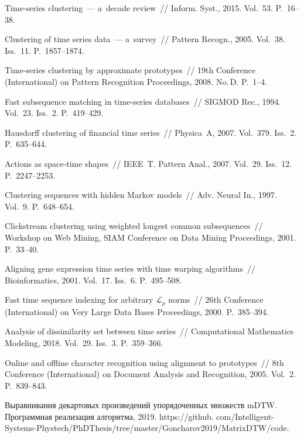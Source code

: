 \begin{multicols}{2}
{{\begin{thebibliography}{99}
Time-series clustering~--- a~decade review~// Inform. Syst., 
2015. Vol.~53. P.~16--38.

 Clustering of time series data~--- a~survey~// 
Pattern Recogn., 2005. Vol.~38. Iss.~11. P.~1857--1874.



Time-series clustering by approximate prototypes~// 
19th  Conference (International) on Pattern Recognition Proceedings, 2008. No.\,D. 
P.~1--4.

Fast subsequence matching in time-series databases~// \mbox{SIGMOD} Rec., 1994. 
Vol.~23. Iss.~2. P.~419--429.

 Hausdorff clustering of financial time series~// 
Physica~A, 2007. Vol.~379. Iss.~2. P.~635--644.

Actions as space-time shapes~// IEEE~T. Pattern Anal., 
2007. Vol.~29. Iss.~12. P.~2247--2253.

 Clustering sequences with hidden Markov models~// 
Adv. Neural In., 1997. Vol.~9. P.~648--654.

 Clickstream clustering using weighted 
longest common subsequences~// 
Workshop on Web Mining, SIAM Conference on Data Mining
Proceedings, 2001. P.~33--40.

 Aligning gene expression time series
 with time warping algorithms~// Bioinformatics, 2001. Vol.~17. Iss.~6. P.~495--508.

 Fast time sequence indexing 
for arbitrary $\mathcal{L}_p$ norms~// 
26th  Conference (International) on Very Large Data Bases Proceedings, 2000. P.~385--394.

Analysis of dissimilarity set between time series~// Computational 
Mathematics Modeling, 2018. Vol.~29. Iss.~3. P.~359--366.

 Online and offline character recognition using alignment to prototypes~// 
 8th  Conference (International) on Document Analysis and Recognition, 2005. 
 Vol.~2. P.~839--843.

Выравнивания декартовых произведений упорядоченных множеств mDTW. 
Про\-грам\-мная реализация алгоритма, 2019. 
{\sf https://github.
com/Intelligent-Systems-Phystech/PhDThesis/tree/\linebreak  master/Goncharov2019/MatrixDTW/code}.
 \end{thebibliography}

 }
 }

\end{multicols}

